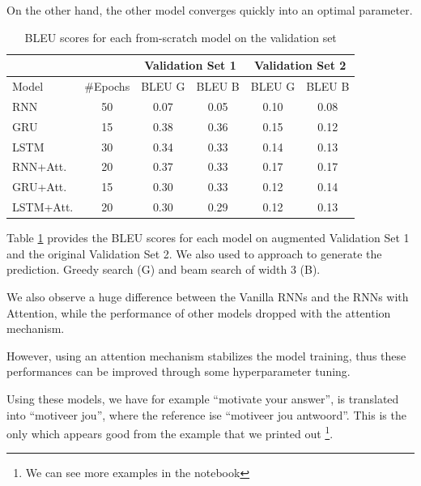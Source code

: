 On the other hand, the other model converges quickly into an optimal parameter.

\begin{table}[H]
	\centering
	\begin{tabular}{lccccc}
		\cmidrule(l){3-6}
		\multicolumn{2}{l}{} & \multicolumn{2}{c}{Validation Set 1} & \multicolumn{2}{c}{Validation Set 2} \\ \midrule
		Model     & \#Epochs & BLEU G          & BLEU B         & BLEU G          & BLEU B         \\ \midrule
		RNN       & 50       & 0.07            & 0.05           & 0.10            & 0.08           \\
		GRU       & 15       & 0.38            & 0.36           & 0.15            & 0.12           \\
		LSTM      & 30       & 0.34            & 0.33           & 0.14            & 0.13           \\
		RNN+Att.  & 20       & 0.37            & 0.33           & 0.17            & 0.17           \\
		GRU+Att.  & 15       & 0.30            & 0.33           & 0.12            & 0.14           \\
		LSTM+Att. & 20       & 0.30            & 0.29           & 0.12            & 0.13           \\ \bottomrule
	\end{tabular}
	\caption{BLEU scores for each from-scratch model on the validation set}
	\label{tab:tab1}
\end{table}

Table \ref{tab:tab1} provides the BLEU scores for each model on augmented Validation Set 1 and the original Validation Set 2. We also used to approach to generate the prediction. Greedy search (G) and beam search of width 3 (B).

We also observe a huge difference between the Vanilla RNNs and the RNNs with Attention, while the performance of other models dropped with the attention mechanism.

However, using an attention mechanism stabilizes the model training, thus these performances can be improved through some hyperparameter tuning.

Using these models, we have for example ``motivate your answer'', is translated into ``motiveer jou'',  where the reference ise ``motiveer jou antwoord''. This is the only which appears good from the example that we printed out \footnote{We can see more examples in the notebook}.

